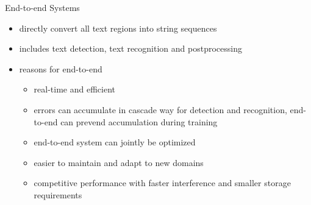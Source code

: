 End-to-end Systems
\begin{itemize}
    \item directly convert all text regions into string sequences
    \item includes text detection, text recognition and postprocessing
    \item reasons for end-to-end
        \begin{itemize}
            \item real-time and efficient
            \item errors can accumulate in cascade way for detection and recognition, end-to-end
                can prevend accumulation during training
            \item end-to-end system can jointly be optimized
            \item easier to maintain and adapt to new domains
            \item competitive performance with faster interference and smaller storage requirements
        \end{itemize}
\end{itemize}


